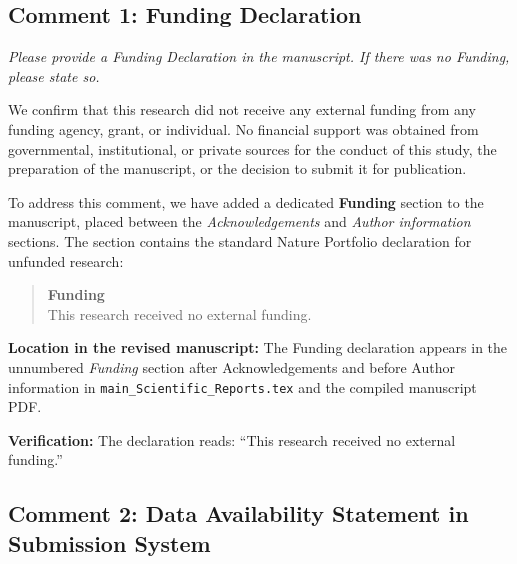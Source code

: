\documentclass[11pt,a4paper]{article}
\begin{document}
\subsection*{Comment 1: Funding Declaration}

\begin{tcolorbox}[colback=yellow!5!white,colframe=black!50!white,title=\textbf{Editor Comment}]
\textit{Please provide a Funding Declaration in the manuscript. If there was no Funding, please state so.}
\end{tcolorbox}

\begin{tcolorbox}[colback=green!5!white,colframe=black!50!white,title=\textbf{Our Response}]
We confirm that this research did not receive any external funding from any funding agency, grant, or individual. No financial support was obtained from governmental, institutional, or private sources for the conduct of this study, the preparation of the manuscript, or the decision to submit it for publication.

To address this comment, we have added a dedicated \textbf{Funding} section to the manuscript, placed between the \textit{Acknowledgements} and \textit{Author information} sections. The section contains the standard Nature Portfolio declaration for unfunded research:

\begin{quote}
\textbf{Funding}\\
This research received no external funding.
\end{quote}

\textbf{Location in the revised manuscript:} The Funding declaration appears in the unnumbered \textit{Funding} section after Acknowledgements and before Author information in \texttt{main\_Scientific\_Reports.tex} and the compiled manuscript PDF.

\textbf{Verification:} The declaration reads: ``This research received no external funding.''
\end{tcolorbox}

\label{sec:funding}

\subsection*{Comment 2: Data Availability Statement in Submission System}
\end{document}
